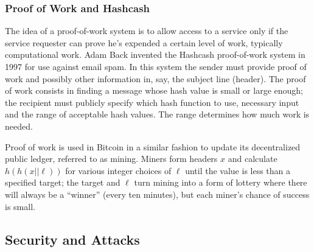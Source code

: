 \documentclass[a4paper,12pt]{article}
\begin{document}
\begin{comment}
\subsubsection{Proof of Knowledge}

Suppose Alice and Beatrice are trying to solve a riddle. Once they've both come up with an answer, if the second person to reveal her answer realizes she is wrong upon hearing the other person's answer, and is dishonest, she could change her answer to the same as the other person, and it would seem as if they both solved the riddle.

Instead, both Alice and Bob hash their respective answer before revealing it to the other, and the answers are hashed again to determine if any of them changed her answer.
\end{comment}

\subsubsection{Proof of Work and Hashcash}

The idea of a proof-of-work system is to allow access to a service only if the service requester can prove he's expended a certain level of work, typically computational work. Adam Back invented the Hashcash proof-of-work system in 1997 for use against email spam. In this system the sender must provide proof of work and possibly other information in, say, the subject line (header). The proof of work consists in finding a message whose hash value is small or large enough; the recipient must publicly specify which hash function to use, necessary input and the range of acceptable hash values. The range determines how much work is needed. \cite{hashcash}

Proof of work is used in Bitcoin in a similar fashion to update its decentralized public ledger, referred to as mining. Miners form headers $x$ and calculate $h(h(x||\ell))$ for various integer choices of $\ell$ until the value is less than a specified target; the target and $\ell$ turn mining into a form of lottery where there will always be a ``winner'' (every ten minutes), but each miner's chance of success is small.

\subsection{Security and Attacks}
\end{document}
